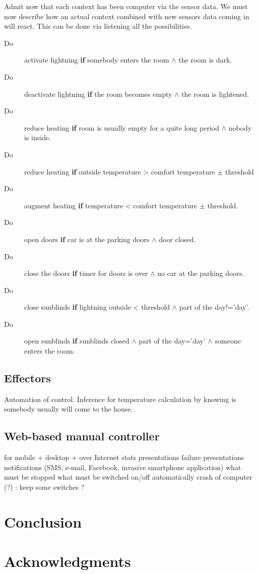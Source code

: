 \documentclass{acm_proc_article-sp}
\begin{document}
Admit now that each context has been computer via the sensor data. We must now describe how an actual context combined with new sensors data coming in will react. This can be done via listening all the possibilities.
\begin{description}
 \item[Do] activate lightning \textbf{if} somebody enters the room $\land$ the room is dark.
 \item[Do] deactivate lightning \textbf{if} the room becomes empty $\land$ the room is lightened.
 \item[Do] reduce heating \textbf{if} room is usually empty for a quite long period $\land$ nobody is inside.
 \item[Do] reduce heating \textbf{if} outside temperature > comfort temperature $\pm$ threshold
 \item[Do] augment heating \textbf{if} temperature < comfort temperature $\pm$ threshold.
 \item[Do] open doors \textbf{if} car is at the parking doors $\land$ door closed.
 \item[Do] close the doors \textbf{if} timer for doors is over $\land$ no car at the parking doors.
 \item[Do] close sunblinds \textbf{if} lightning outside < threshold $\land$ part of the day!=’day’.
 \item[Do] open sunblinds \textbf{if} sunblinds closed $\land$ part of the day=’day’ $\land$ someone enters the room.
\end{description}

\subsection{Effectors}
Automation of control. Inference for temperature calculation by knowing is somebody usually will come to the house.
\subsection{Web-based manual controller}
for mobile + desktop + over Internet
stats presentations
failure presentations
notifications (SMS, e-mail, Facebook, invasive smartphone application)
	what must be stopped
	what must be switched on/off automatically
	crash of computer (?) : keep some switches ?
\section{Conclusion}
\section{Acknowledgments}



%
\end{document}
